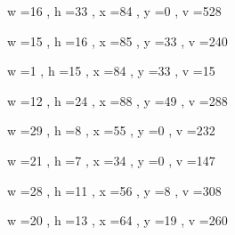 \documentclass[11pt]{article}
\begin{document}
w =16 , h =33 , x =84 , y =0 , v =528
\par
w =15 , h =16 , x =85 , y =33 , v =240
\par
w =1 , h =15 , x =84 , y =33 , v =15
\par
w =12 , h =24 , x =88 , y =49 , v =288
\par
w =29 , h =8 , x =55 , y =0 , v =232
\par
w =21 , h =7 , x =34 , y =0 , v =147
\par
w =28 , h =11 , x =56 , y =8 , v =308
\par
w =20 , h =13 , x =64 , y =19 , v =260
\par
\newpage
\end{document}
